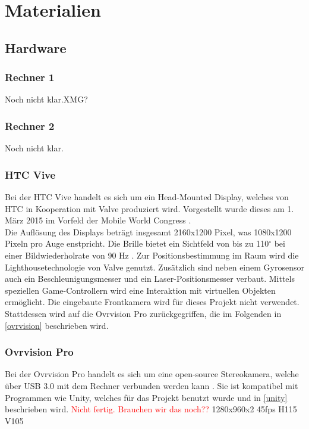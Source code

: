 \section{Materialien}
\subsection{Hardware}
\subsubsection{Rechner 1} 
Noch nicht klar.XMG?
\subsubsection{Rechner 2} 
Noch nicht klar.
\subsubsection{HTC Vive} 
Bei der HTC Vive handelt es sich um ein Head-Mounted Display, welches von HTC in Kooperation mit Valve \cite{website:Valve} produziert wird. Vorgestellt wurde dieses am 1. März 2015 im Vorfeld der Mobile World Congress \cite{website:mobileworldcongress}.\\
Die Auflösung des Displays beträgt insgesamt 2160x1200 Pixel, was 1080x1200 Pixeln pro Auge enstpricht. Die Brille bietet ein Sichtfeld von bis zu 110$^\circ$ bei einer Bildwiederholrate von 90 Hz \cite{website:HTC_Vive}. Zur Positionsbestimmung im Raum wird die Lighthousetechnologie von Valve genutzt. Zusätzlich sind neben einem Gyrosensor auch ein Beschleunigungsmesser und ein Laser-Positionsmesser verbaut. Mittels speziellen Game-Controllern wird eine Interaktion mit virtuellen Objekten ermöglicht. Die eingebaute Frontkamera wird für dieses Projekt nicht verwendet. Stattdessen wird auf die Ovrvision Pro zurückgegriffen, die im Folgenden in \ref{ovrvision} beschrieben wird.

\subsubsection{Ovrvision Pro \label{ovrvision}} 
Bei der Ovrvision Pro handelt es sich um eine open-source Stereokamera, welche über USB 3.0 mit dem Rechner verbunden werden kann \cite{website:ovrvision}. Sie ist kompatibel mit Programmen wie Unity, welches für das Projekt benutzt wurde und in \ref{unity} beschrieben wird. 
\textcolor{red}{Nicht fertig. Brauchen wir das noch??}
1280x960x2	45fps	H115 V105



